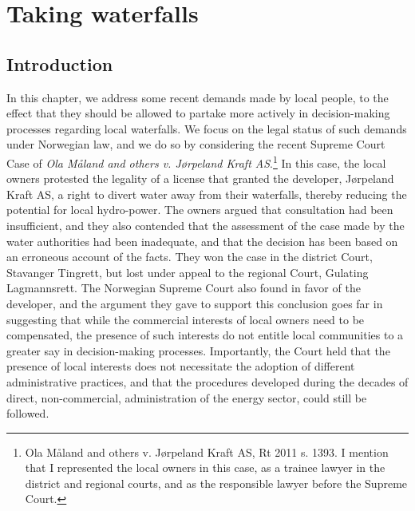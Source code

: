 \chapter{Taking waterfalls}\label{chap:4}

\section{Introduction}\label{sec:intro4}

In this chapter, we address some recent demands made by local people, to the effect that they should be allowed to partake more actively in decision-making processes regarding local waterfalls. We focus on the legal status of such demands under Norwegian law, and we do so by considering the recent Supreme Court Case of \emph{Ola Måland and others v. Jørpeland Kraft AS}.\footnote{Ola M{\aa}land and others v. J{\o}rpeland Kraft AS, Rt 2011 s. 1393. I mention that I represented the local owners in this case, as a trainee lawyer in the district and regional courts, and as the responsible lawyer before the Supreme Court.} In this case, the local owners protested the legality of a license that granted the developer, Jørpeland Kraft AS, a right to divert water away from their waterfalls, thereby reducing the potential for local hydro-power. The owners argued that consultation had been insufficient, and they also contended that the assessment of the case made by the water authorities had been inadequate, and that the decision has been based on an erroneous account of the facts. They won the case in the district Court, Stavanger Tingrett, but lost under appeal to the regional Court, Gulating Lagmannsrett. The Norwegian Supreme Court also found in favor of the developer, and the argument they gave to support this conclusion goes far in suggesting that while the commercial interests of local owners need to be compensated, the presence of such interests do not entitle local communities to a greater say in decision-making processes. Importantly, the Court held that the presence of local interests does not necessitate the adoption of different administrative practices, and that the procedures developed during the decades of direct, non-commercial, administration of the energy sector, could still be followed.

